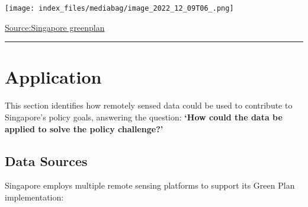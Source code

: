 \documentclass[
  letterpaper,
  DIV=11,
  numbers=noendperiod]{scrreprt}
\begin{document}
\texttt{[image: index\_files/mediabag/image\_2022\_12\_09T06\_.png]}

\href{https://www.greenplan.gov.sg/}{Source:Singapore greenplan}

\begin{center}\rule{0.5\linewidth}{0.5pt}\end{center}

\section{Application}\label{application}

This section identifies how remotely sensed data could be used to
contribute to Singapore's policy goals, answering the question:
\textbf{`How could the data be applied to solve the policy challenge?'}

\subsection{Data Sources}\label{data-sources}

Singapore employs multiple remote sensing platforms to support its Green
Plan implementation:
\end{document}
